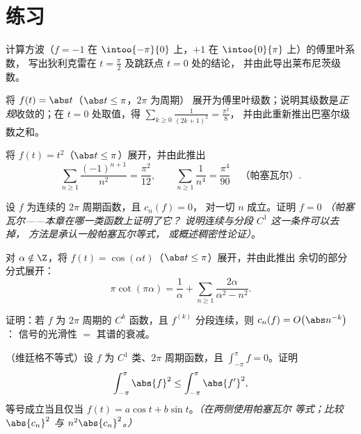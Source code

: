 \section{练习}

\begin{exercise}[$\star$]\label{exo:b2:fourier:1}
计算方波（$f = -1$ 在
$\intoo{-\pi}{0}$ 上，$+1$ 在 $\intoo{0}{\pi}$ 上）的傅里叶系数，
写出狄利克雷在 $t = \frac\pi2$ 及跳跃点 $t = 0$ 处的结论，
并由此导出莱布尼茨级数。
\end{exercise}

\begin{exercise}[$\star$]\label{exo:b2:fourier:2}
将 $f(t) = \abs t$（$\abs t \leq \pi$，$2\pi$ 为周期）
展开为傅里叶级数；说明其级数是\emph{正规}收敛的；在 $t =
0$ 处取值，得 $\sum_{k\geq0}\frac{1}{(2k+1)^2} = \frac{\pi^2}{8}$，
并由此重新推出巴塞尔级数之和。
\end{exercise}

\begin{exercise}[$\star$]\label{exo:b2:fourier:3}
将 $f(t) = t^2$（$\abs t \leq \pi$）展开，并由此推出
\[
\sum_{n\geq1}\frac{(-1)^{n+1}}{n^2} = \frac{\pi^2}{12},
\qquad
\sum_{n\geq1}\frac{1}{n^4} = \frac{\pi^4}{90}
\quad\text{（帕塞瓦尔）}.
\]
\end{exercise}

\begin{exercise}[$\star\star$]\label{exo:b2:fourier:4}
设 $f$ 为连续的 $2\pi$ 周期函数，且 $c_n(f) = 0$，
对一切 $n$ 成立。证明 $f = 0$ \emph{（帕塞瓦尔——本章在哪一类函数上证明了它？
说明连续与分段 $C^1$ 这一条件可以去掉，
方法是承认一般帕塞瓦尔等式，
或概述稠密性论证）}。
\end{exercise}

\begin{exercise}[$\star\star$]\label{exo:b2:fourier:5}
对 $\alpha \notin \Z$，将 $f(t) = \cos(\alpha t)$（$\abs t
\leq \pi$）展开，并由此推出
余切的部分分式展开：
\[
\pi\cot(\pi\alpha) = \frac{1}{\alpha} + \sum_{n\geq1}
\frac{2\alpha}{\alpha^2 - n^2} .
\]
\end{exercise}

\begin{exercise}[$\star\star$]\label{exo:b2:fourier:6}
证明：若 $f$ 为 $2\pi$ 周期的 $C^k$ 函数，且 $f^{(k)}$
分段连续，则 $c_n(f) = O\bigl(\abs n^{-k}\bigr)$：
信号的光滑性 $=$ 其谱的衰减。
\end{exercise}

\begin{exercise}[$\star\star\star$]\label{exo:b2:fourier:7}
（维廷格不等式）设 $f$ 为 $C^1$ 类、$2\pi$ 周期函数，且
$\int_{-\pi}^{\pi} f = 0$。证明
\[
\int_{-\pi}^{\pi} \abs{f}^2 \leq \int_{-\pi}^{\pi} \abs{f'}^2 ,
\]
等号成立当且仅当 $f(t) = a\cos t + b\sin t$。\emph{（在两侧使用帕塞瓦尔
等式；比较 $\abs{c_n}^2$ 与 $n^2\abs{c_n}^2$。）}
\end{exercise}

